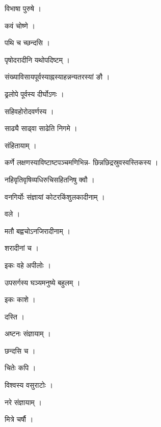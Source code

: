 \documentclass[10pt, openany]{book}
\begin{document}
\noindent विभाषा पुरुषे ।

\noindent कवं चोष्णे ।

\noindent पथि च च्छन्दसि ।

\noindent पृषोदरादीनि यथोपदिष्टम् ।

\noindent संख्याविसायपूर्वस्याह्नस्याहन्नन्यतरस्यां ङौ ।

\noindent ढ्रलोपे पूर्वस्य दीर्घोऽणः ।

\noindent सहिवहोरोदवर्णस्य ।

\noindent साढ्यै साढ्वा साढेति निगमे ।

\noindent संहितायाम् ।

\noindent कर्णे लक्षणस्याविष्टाष्टपञ्चमणिभिन्न- छिन्नछिद्रस्रुवस्वस्तिकस्य ।

\noindent नहिवृतिवृषिव्यधिरुचिसहितनिषु क्वौ ।

\noindent वनगिर्योः संज्ञायां कोटरकिंशुलकादीनाम् ।

\noindent वले ।

\noindent मतौ बह्वचोऽनजिरादीनाम् ।

\noindent शरादीनां च ।

\noindent इकः वहे अपीलोः ।

\noindent उपसर्गस्य घञ्यमनुष्ये बहुलम् ।

\noindent इकः काशे ।

\noindent दस्ति ।

\noindent अष्टनः संज्ञायाम् ।

\noindent छन्दसि च ।

\noindent चितेः कपि ।

\noindent विश्वस्य वसुराटोः ।

\noindent नरे संज्ञायाम् ।

\noindent मित्रे चर्षौ ।
\end{document}
